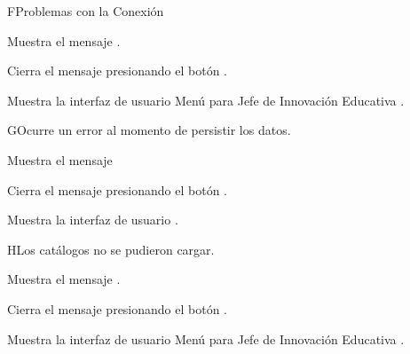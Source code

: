 
\begin{UCtrayectoriaA}{F}{Problemas con la Conexión}

    \UCpaso Muestra el mensaje .

    \UCpaso[\UCactor] Cierra el mensaje presionando el botón .

\UCpaso Muestra la interfaz de usuario Menú para Jefe de Innovación Educativa .

\end{UCtrayectoriaA}


\begin{UCtrayectoriaA}{G}{Ocurre un error al momento de persistir los datos.}

    \UCpaso Muestra el mensaje 

    \UCpaso[\UCactor] Cierra el mensaje presionando el botón .

    \UCpaso Muestra la interfaz de usuario .

\end{UCtrayectoriaA}

\begin{UCtrayectoriaA}{H}{Los catálogos no se pudieron cargar.}

    \UCpaso Muestra el mensaje .

    \UCpaso[\UCactor] Cierra el mensaje presionando el botón .

    \UCpaso Muestra la interfaz de usuario Menú para Jefe de Innovación Educativa .


\end{UCtrayectoriaA}